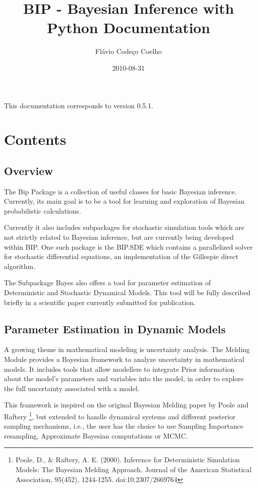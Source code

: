 \documentclass[a4paper,10pt,english]{sphinxmanual}
\title{BIP - Bayesian Inference with Python Documentation}
\date{2010-08-31}
\author{Flávio Codeço Coelho}
\begin{document}
\maketitle
\tableofcontents
{}\label{index::doc}


This documentation corresponds to version 0.5.1.


\chapter{Contents}
\label{index:contents}\label{index:welcome-to-bip-bayesian-inference-with-python-s-documentation}

\section{Overview}
\label{overview:overview}\label{overview::doc}
The Bip Package is a collection of useful classes for basic Bayesian inference. Currently, its main goal is to be a tool for learning and exploration of Bayesian probabilistic calculations.

Currently it also includes subpackages for stochastic simulation tools which are not strictly related to Bayesian inference, but are currently being developed within BIP. One such package is the BIP.SDE which contains a parallelized solver for stochastic differential equations, an implementation of the Gillespie direct algorithm.

The Subpackage Bayes also offers a tool for parameter estimation of Deterministic and Stochastic Dynamical Models. This tool will be fully described briefly in a scientific paper currently submitted for publication.


\section{Parameter Estimation in Dynamic Models}
\label{paramest:parameter-estimation-in-dynamic-models}\label{paramest::doc}
A growing theme in mathematical modeling is uncertainty analysis. The Melding Module provides a Bayesian framework to analyze uncertainty in mathematical models. It includes tools that allow modellers to integrate Prior information about the model's parameters and variables into the model, in order to explore the full uncertainty associated with a model.

This framework is inspired on the original Bayesian Melding paper by Poole and Raftery \footnote{
Poole, D., \& Raftery, A. E. (2000). Inference for Deterministic Simulation Models: The Bayesian Melding Approach. Journal of the American Statistical Association, 95(452), 1244-1255. doi:10.2307/2669764
}, but extended to handle dynamical systems and different posterior sampling mechanisms, i.e., the user has the choice to use Sampling Importance resampling, Approximate Bayesian computations or MCMC.
\end{document}
